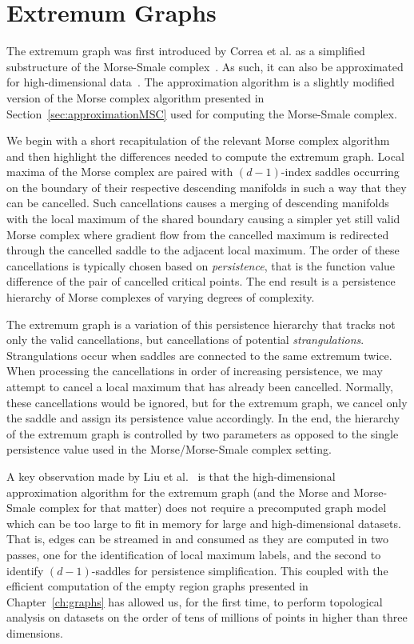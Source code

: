 \section{Extremum Graphs}
\label{sec:extremumGraph}

The extremum graph was first introduced by Correa et al. as a simplified substructure of the Morse-Smale complex~\cite{CorreaLindstromBremer2011}.
%
As such, it can also be approximated for high-dimensional data~\cite{CorreaLindstromBremer2011,ThomasNatarajan2013}.
%
The approximation algorithm is a slightly modified version of the Morse complex algorithm presented in Section~\ref{sec:approximationMSC} used for computing the Morse-Smale complex.

We begin with a short recapitulation of the relevant Morse complex algorithm and then highlight the differences needed to compute the extremum graph.
%
Local maxima of the Morse complex are paired with $(d-1)$-index saddles occurring on the boundary of their respective descending manifolds in such a way that they can be cancelled.
%
Such cancellations causes a merging of descending manifolds with the local maximum of the shared boundary causing a simpler yet still valid Morse complex where gradient flow from the cancelled maximum is redirected through the cancelled saddle to the adjacent local maximum.
%
The order of these cancellations is typically chosen based on \textit{persistence}, that is the function value difference of the pair of cancelled critical points.
%
The end result is a persistence hierarchy of Morse complexes of varying degrees of complexity.

The extremum graph is a variation of this persistence hierarchy that tracks not only the valid cancellations, but cancellations of potential \textit{strangulations}.
%
Strangulations occur when saddles are connected to the same extremum twice.
%
When processing the cancellations in order of increasing persistence, we may attempt to cancel a local maximum that has already been cancelled.
%
Normally, these cancellations would be ignored, but for the extremum graph, we cancel only the saddle and assign its persistence value accordingly.
%
In the end, the hierarchy of the extremum graph is controlled by two parameters as opposed to the single persistence value used in the Morse/Morse-Smale complex setting.

A key observation made by Liu et al.~\cite{LiuWangMaljovec2019} is that the high-dimensional approximation algorithm for the extremum graph (and the Morse and Morse-Smale complex for that matter) does not require a precomputed graph model which can be too large to fit in memory for large and high-dimensional datasets.
%
That is, edges can be streamed in and consumed as they are computed in two passes, one for the identification of local maximum labels, and the second to identify $(d-1)$-saddles for persistence simplification.
%
This coupled with the efficient computation of the empty region graphs presented in Chapter~\ref{ch:graphs} has allowed us, for the first time, to perform topological analysis on datasets on the order of tens of millions of points in higher than three dimensions.

% 